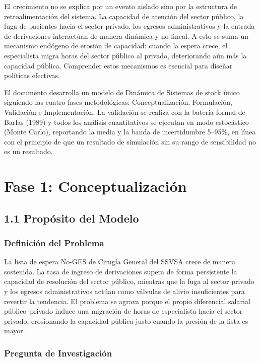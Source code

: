 \documentclass[12pt,a4paper]{article}
\begin{document}
El crecimiento no se explica por un evento aislado sino por la estructura de retroalimentación del sistema. La capacidad de atención del sector público, la fuga de pacientes hacia el sector privado, los egresos administrativos y la entrada de derivaciones interactúan de manera dinámica y no lineal. A esto se suma un mecanismo endógeno de erosión de capacidad: cuando la espera crece, el especialista migra horas del sector público al privado, deteriorando aún más la capacidad pública. Comprender estos mecanismos es esencial para diseñar políticas efectivas.

El documento desarrolla un modelo de Dinámica de Sistemas de stock único siguiendo las cuatro fases metodológicas: Conceptualización, Formulación, Validación e Implementación. La validación se realiza con la batería formal de Barlas (1989) y todos los análisis cuantitativos se ejecutan en modo estocástico (Monte Carlo), reportando la media y la banda de incertidumbre 5--95\%, en línea con el principio de que un resultado de simulación sin su rango de sensibilidad no es un resultado.

\section*{Fase 1: Conceptualización}

\subsection*{1.1 Propósito del Modelo}

\subsubsection*{Definición del Problema}

La lista de espera No-GES de Cirugía General del SSVSA crece de manera sostenida. La tasa de ingreso de derivaciones supera de forma persistente la capacidad de resolución del sector público, mientras que la fuga al sector privado y los egresos administrativos actúan como válvulas de alivio insuficientes para revertir la tendencia. El problema se agrava porque el propio diferencial salarial público--privado induce una migración de horas de especialista hacia el sector privado, erosionando la capacidad pública justo cuando la presión de la lista es mayor.

\subsubsection*{Pregunta de Investigación}
\end{document}
